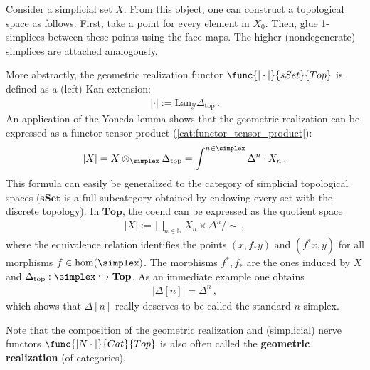     \begin{example}\label{model:geometric_realization}
        Consider a simplicial set $X$. From this object, one can construct a topological space as follows. First, take a point for every element in $X_0$. Then, glue 1-simplices between these points using the face maps. The higher (nondegenerate) simplices are attached analogously.

        More abstractly, the geometric realization functor $\func{|\cdot|}{sSet}{Top}$ is defined as a (left) Kan extension:
        \begin{gather}
            |\cdot| := \mathrm{Lan}_{\mathcal{Y}}\Delta_\mathrm{top}\,.
        \end{gather}
        An application of the Yoneda lemma shows that the geometric realization can be expressed as a functor tensor product (\cref{cat:functor_tensor_product}):
        \begin{gather}
            |X| = X\otimes_{\simplex}\Delta_\mathrm{top}=\int^{n\in\simplex}\Delta^n\cdot X_n\,.
        \end{gather}
        This formula can easily be generalized to the category of simplicial topological spaces ($\mathbf{sSet}$ is a full subcategory obtained by endowing every set with the discrete topology). In $\mathbf{Top}$, the coend can be expressed as the quotient space
        \begin{gather}
            |X| := \bigsqcup_{n\in\mathbb{N}}X_n\times\Delta^n/\sim\,,
        \end{gather}
        where the equivalence relation identifies the points $(x,f_*y)$ and $(f^*x,y)$ for all morphisms $f\in\mathrm{hom}(\simplex)$. The morphisms $f^*,f_*$ are the ones induced by $X$ and $\Delta_\mathrm{top}:\simplex\hookrightarrow\mathbf{Top}$. As an immediate example one obtains
        \begin{gather}
            |\Delta[n]| = \Delta^n\,,
        \end{gather}
        which shows that $\Delta[n]$ really deserves to be called the standard $n$-simplex.
    \end{example}
    \begin{remark}\label{model:geometric_realization_categories}
        Note that the composition of the geometric realization and (simplicial) nerve functors $\func{|N\cdot|}{Cat}{Top}$ is also often called the \textbf{geometric realization} (of categories).
    \end{remark}

